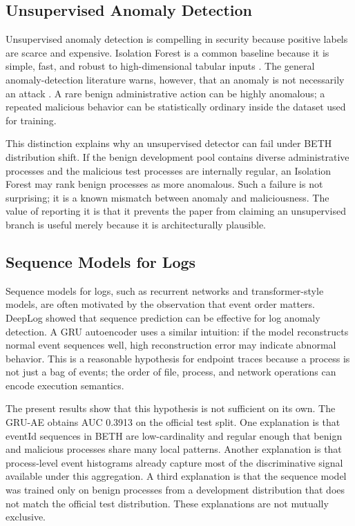 \documentclass[10pt,journal,compsoc]{IEEEtran}
\begin{document}
\subsection{Unsupervised Anomaly Detection}

Unsupervised anomaly detection is compelling in security because positive labels are scarce and expensive. Isolation Forest is a common baseline because it is simple, fast, and robust to high-dimensional tabular inputs \cite{liu2008}. The general anomaly-detection literature warns, however, that an anomaly is not necessarily an attack \cite{chandola2009}. A rare benign administrative action can be highly anomalous; a repeated malicious behavior can be statistically ordinary inside the dataset used for training.

This distinction explains why an unsupervised detector can fail under BETH distribution shift. If the benign development pool contains diverse administrative processes and the malicious test processes are internally regular, an Isolation Forest may rank benign processes as more anomalous. Such a failure is not surprising; it is a known mismatch between anomaly and maliciousness. The value of reporting it is that it prevents the paper from claiming an unsupervised branch is useful merely because it is architecturally plausible.

\subsection{Sequence Models for Logs}

Sequence models for logs, such as recurrent networks and transformer-style models, are often motivated by the observation that event order matters. DeepLog \cite{du2017} showed that sequence prediction can be effective for log anomaly detection. A GRU autoencoder uses a similar intuition: if the model reconstructs normal event sequences well, high reconstruction error may indicate abnormal behavior. This is a reasonable hypothesis for endpoint traces because a process is not just a bag of events; the order of file, process, and network operations can encode execution semantics.

The present results show that this hypothesis is not sufficient on its own. The GRU-AE obtains AUC 0.3913 on the official test split. One explanation is that eventId sequences in BETH are low-cardinality and regular enough that benign and malicious processes share many local patterns. Another explanation is that process-level event histograms already capture most of the discriminative signal available under this aggregation. A third explanation is that the sequence model was trained only on benign processes from a development distribution that does not match the official test distribution. These explanations are not mutually exclusive.
\end{document}
